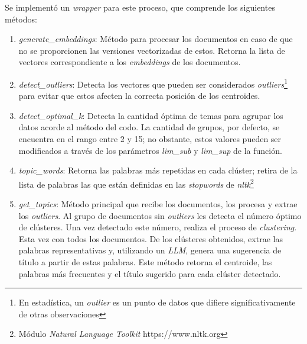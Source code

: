     Se implementó un \emph{wrapper} para este proceso, que comprende los siguientes métodos:
    \begin{enumerate}
        \item \emph{generate\_embeddings}: Método para procesar los documentos en caso de que no se proporcionen las versiones vectorizadas de estos. Retorna la lista de vectores correspondiente a los \emph{embeddings} de los documentos.
        \item \emph{detect\_outliers}: Detecta los vectores que pueden ser considerados \emph{outliers}\footnote{En estadística, un \emph{outlier} es un punto de datos que difiere significativamente de otras observaciones} para evitar que estos afecten la correcta posición de los centroides.
        \item \emph{detect\_optimal\_k}: Detecta la cantidad óptima de temas para agrupar los datos acorde al método del codo. La cantidad de grupos, por defecto, se encuentra en el rango entre 2 y 15; no obstante, estos valores pueden ser modificados a través de los parámetros \emph{lim\_sub} y \emph{lim\_sup} de la función.
        \item \emph{topic\_words}: Retorna las palabras más repetidas en cada cl\'uster; retira de la lista de palabras las que están definidas en las \emph{stopwords} de \emph{nltk}\footnote{Módulo \emph{Natural Language Toolkit} https://www.nltk.org}
        \item \emph{get\_topics}: Método principal que recibe los documentos, los procesa y extrae los \emph{outliers}. Al grupo de documentos sin \emph{outliers} les detecta el número óptimo de cl\'usteres. Una vez detectado este número, realiza el proceso de \emph{clustering}. Esta vez con todos los documentos. De los cl\'usteres obtenidos, extrae las palabras representativas y, utilizando un \emph{LLM}, genera una sugerencia de título a partir de estas palabras. Este método retorna el centroide, las palabras más frecuentes y el título sugerido para cada clúster detectado.
    \end{enumerate}

